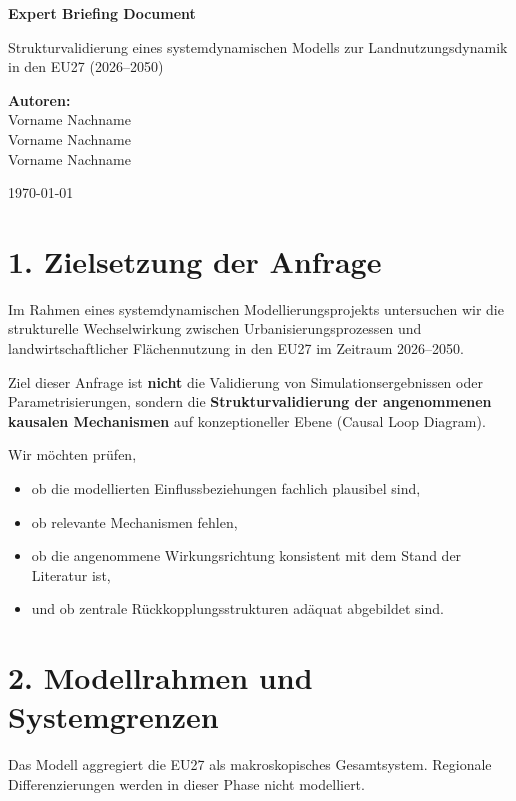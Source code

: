 \documentclass[10pt, a4paper]{article}
\begin{document}
\begin{titlepage}
    \centering
    \vspace*{4cm}
    {\Huge \textbf{Expert Briefing Document}\par}
    \vspace{1.5cm}
    {\Large Strukturvalidierung eines systemdynamischen Modells zur Landnutzungsdynamik in den EU27 (2026–2050)\par}
    
    \vspace{4cm}
    {\large \textbf{Autoren:}\\
    Vorname Nachname\\
    Vorname Nachname\\
    Vorname Nachname\par}
    
    \vfill
    {\large \today\par}
\end{titlepage}

\newpage

\small

\section*{1. Zielsetzung der Anfrage}
Im Rahmen eines systemdynamischen Modellierungsprojekts untersuchen wir die strukturelle Wechselwirkung zwischen Urbanisierungsprozessen und landwirtschaftlicher Flächennutzung in den EU27 im Zeitraum 2026–2050.

Ziel dieser Anfrage ist \textbf{nicht} die Validierung von Simulationsergebnissen oder Parametrisierungen, sondern die \textbf{Strukturvalidierung der angenommenen kausalen Mechanismen} auf konzeptioneller Ebene (Causal Loop Diagram).

Wir möchten prüfen,
\begin{itemize}[itemsep=0pt, leftmargin=*]
    \item ob die modellierten Einflussbeziehungen fachlich plausibel sind,
    \item ob relevante Mechanismen fehlen,
    \item ob die angenommene Wirkungsrichtung konsistent mit dem Stand der Literatur ist,
    \item und ob zentrale Rückkopplungsstrukturen adäquat abgebildet sind.
\end{itemize}

\section*{2. Modellrahmen und Systemgrenzen}
Das Modell aggregiert die EU27 als makroskopisches Gesamtsystem. Regionale Differenzierungen werden in dieser Phase nicht modelliert.
\end{document}
